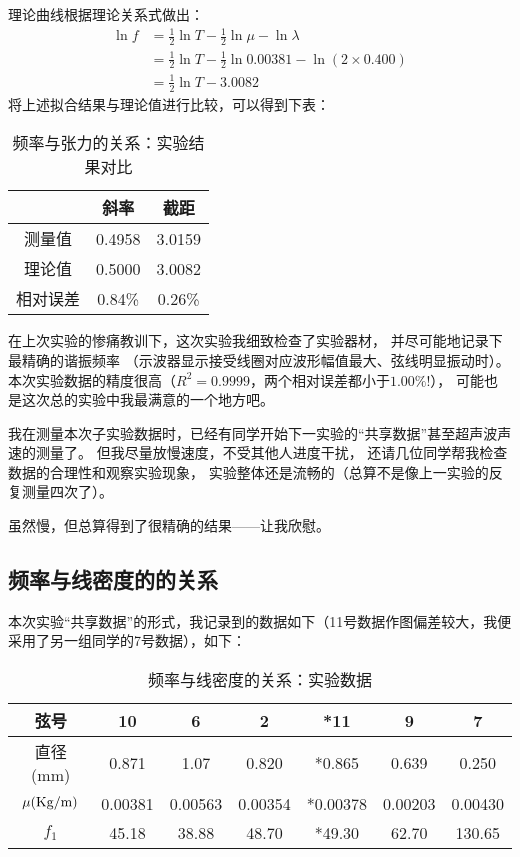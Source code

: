 \documentclass[11pt]{article}
\begin{document}
理论曲线根据理论关系式做出：
\begin{align*}
    \ln f&=\frac{1}{2}\ln T-\frac{1}{2}\ln \mu-\ln\lambda\\
   &=\frac{1}{2}\ln T-\frac{1}{2}\ln 0.00381-\ln(2\times 0.400)\\
   &=\frac{1}{2}\ln T-3.0082
\end{align*}
将上述拟合结果与理论值进行比较，可以得到下表：
\begin{table}[!ht]
    \centering
    \caption{频率与张力的关系：实验结果对比}
    \begin{tabular}{ccc}
        \toprule
        ~&斜率 & 截距 \\ 
        \midrule
        测量值 & 0.4958 & 3.0159 \\ 
        理论值 & 0.5000 & 3.0082 \\ 
        相对误差 & 0.84\% & 0.26\% \\ 
        \bottomrule
    \end{tabular}
\end{table}

在上次实验的惨痛教训下，这次实验我细致检查了实验器材，
并尽可能地记录下最精确的谐振频率
（示波器显示接受线圈对应波形幅值最大、弦线明显振动时）。
本次实验数据的精度很高（$R^2=0.9999$，两个相对误差都小于$1.00\%$!），
可能也是这次总的实验中我最满意的一个地方吧。

我在测量本次子实验数据时，已经有同学开始下一实验的“共享数据”甚至超声波声速的测量了。
但我尽量放慢速度，不受其他人进度干扰，
还请几位同学帮我检查数据的合理性和观察实验现象，
实验整体还是流畅的（总算不是像上一实验的反复测量四次了）。

虽然慢，但总算得到了很精确的结果——让我欣慰。




\newpage

\subsection{频率与线密度的的关系}
本次实验“共享数据”的形式，我记录到的数据如下（11号数据作图偏差较大，我便采用了另一组同学的7号数据），如下：
\begin{table}[H]
    \centering
    \caption{频率与线密度的关系：实验数据}
    \begin{tabular}{ccccccc}
        \toprule
        弦号 & 10 & 6 & 2 & *11 & 9 & 7 \\ 
        \midrule
        直径(mm) & 0.871 & 1.07 & 0.820 & *0.865 & 0.639 & 0.250 \\ 
        $\mu(\rm Kg/m)$ & 0.00381 & 0.00563 & 0.00354 & *0.00378 & 0.00203 & 0.00430 \\ 
        $f_1$ & 45.18 & 38.88 & 48.70 & *49.30 & 62.70 & 130.65 \\ 
        \bottomrule
    \end{tabular}
\end{table}
\end{document}

